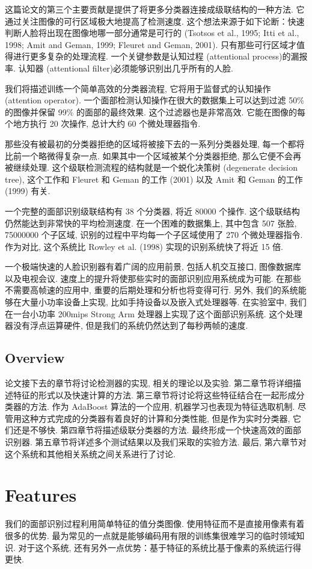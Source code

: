 \documentclass[utf8]{ctexart}
\begin{document}
这篇论文的第三个主要贡献是提供了将更多分类器连接成级联结构的一种方法. 它通过关注图像的可行区域极大地提高了检测速度. 这个想法来源于如下论断：快速判断人脸将出现在图像地哪一部分通常是可行的 (Tsotsos et al., 1995; Itti et al., 1998; Amit and Geman, 1999; Fleuret and Geman, 2001). 
只有那些可行区域才值得进行更多复杂的处理流程. 一个关键参数是认知过程 (attentional process)的漏报率. 认知器 (attentional filter)必须能够识别出几乎所有的人脸. 

我们将描述训练一个简单高效的分类器流程, 它将用于监督式的认知操作 (attention operator). 一个面部检测认知操作在很大的数据集上可以达到过滤 50\% 的图像并保留 99\% 的面部的最终效果. 
这个过滤器也是非常高效. 它能在图像的每个地方执行 20 次操作, 总计大约 60 个微处理器指令. 

那些没有被最初的分类器拒绝的区域将被接下去的一系列分类器处理, 每一个都将比前一个略微得复杂一点. 如果其中一个区域被某个分类器拒绝, 那么它便不会再被继续处理. 这个级联检测流程的结构就是一个蜕化决策树 (degenerate decision tree), 这个工作和 Fleuret 和 Geman 的工作 (2001) 以及 Amit 和 Geman 的工作 (1999) 有关. 

一个完整的面部识别级联结构有 38 个分类器, 将近 80000 个操作. 这个级联结构仍然能达到非常快的平均检测速度. 在一个困难的数据集上, 其中包含 507 张脸, 75000000 个子区域, 识别的过程中平均每一个子区域使用了 270 个微处理器指令. 作为对比, 这个系统比 Rowley et al. (1998) 实现的识别系统快了将近 15 倍. 

一个极端快速的人脸识别器有着广阔的应用前景, 包括人机交互接口, 图像数据库以及电视会议. 速度上的提升将使那些实时的面部识别应用系统成为可能. 在那些不需要高帧速的应用中, 重要的后期处理和分析也将变得可行. 
另外, 我们的系统能够在大量小功率设备上实现, 比如手持设备以及嵌入式处理器等. 在实验室中, 我们在一台小功率 200mips Strong Arm 处理器上实现了这个面部识别系统. 这个处理器没有浮点运算硬件, 但是我们的系统仍然达到了每秒两帧的速度. 
\subsection{Overview}
论文接下去的章节将讨论检测器的实现, 相关的理论以及实验. 
第二章节将详细描述特征的形式以及快速计算的方法. 第三章节将讨论将这些特征结合在一起形成分类器的方法. 作为 AdaBoost 算法的一个应用, 机器学习也表现为特征选取机制. 尽管用这种方式完成的分类器有着良好的计算和分类性能, 但是作为实时分类器, 它们还是不够快. 
第四章节将描述级联分类器的方法. 最终形成一个快速高效的面部识别器. 第五章节将详述多个测试结果以及我们采取的实验方法. 最后, 第六章节对这个系统和其他相关系统之间关系进行了讨论. 
\section{Features}
我们的面部识别过程利用简单特征的值分类图像. 使用特征而不是直接用像素有着很多的优势. 最为常见的一点就是能够编码用有限的训练集很难学习的临时领域知识. 对于这个系统, 还有另外一点优势：基于特征的系统比基于像素的系统运行得更快. 
\end{document}

